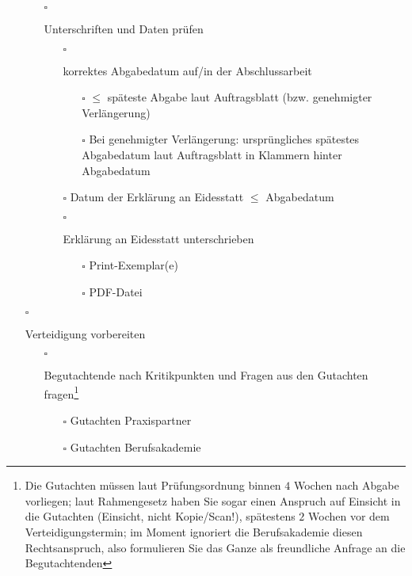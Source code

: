 \begin{itemize}
{\begin{itemize}
{            }
            \item[$\square$]{
                Unterschriften und Daten prüfen
                \begin{itemize}
                    \item[$\square$]{
                        korrektes Abgabedatum auf/in der Abschlussarbeit
                        \begin{itemize}
                            \item[$\square$] $\leq$ späteste Abgabe laut Auftragsblatt (bzw. genehmigter Verlängerung)
                            \item[$\square$] Bei genehmigter Verlängerung: ursprüngliches spätestes Abgabedatum laut Auftragsblatt in Klammern hinter Abgabedatum
                        \end{itemize}
                    }
                    \item[$\square$] Datum der Erklärung an Eidesstatt $\leq$ Abgabedatum
                    \item[$\square$]{
                        Erklärung an Eidesstatt unterschrieben
                        \begin{itemize}
                            \item[$\square$] Print-Exemplar(e)
                            \item[$\square$] PDF-Datei
                        \end{itemize}
                    }
                \end{itemize}
            }
        \end{itemize}
    }
    \item[$\square$]{
        Verteidigung vorbereiten
        \begin{itemize}
            \item[$\square$]{
                Begutachtende nach Kritikpunkten und Fragen aus den Gutachten fragen\footnote{Die Gutachten müssen laut Prüfungsordnung binnen $4$ Wochen nach Abgabe vorliegen; laut Rahmengesetz haben Sie sogar einen Anspruch auf Einsicht in die Gutachten (Einsicht, nicht Kopie/Scan!), spätestens $2$ Wochen vor dem Verteidigungstermin; im Moment ignoriert die Berufsakademie diesen Rechtsanspruch, also formulieren Sie das Ganze als freundliche Anfrage an die Begutachtenden}
                \begin{itemize}
                    \item[$\square$] Gutachten Praxispartner
                    \item[$\square$] Gutachten Berufsakademie

\end{itemize}}
\end{itemize}}
\end{itemize}

